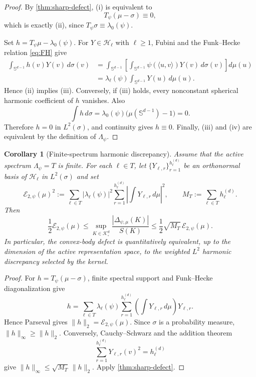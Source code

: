 \documentclass[12pt,a4paper]{article}
\newcommand{\Sph}{\mathbb S}
\newcommand{\K}{\mathcal K}
\newcommand{\Harm}{\mathcal H}
\theoremstyle{plain}
\newtheorem{corollary}[theorem]{Corollary}
\theoremstyle{definition}
\begin{document}
\begin{proof}
By \cref{thm:sharp-defect}, (i) is equivalent to
\[
 T_\psi(\mu-\sigma)\equiv0,
\]
which is exactly (ii), since $T_\psi\sigma\equiv\lambda_0(\psi)$.

Set $h=T_\psi\mu-\lambda_0(\psi)$. For $Y\in\Harm_\ell$ with $\ell\ge1$, Fubini and the Funk--Hecke relation \eqref{eq:FH} give
\[
 \begin{aligned}
 \int_{\Sph^{d-1}}h(v)Y(v)\,d\sigma(v)
 &=\int_{\Sph^{d-1}}
 \left[\int_{\Sph^{d-1}}\psi(\langle u,v\rangle)Y(v)\,d\sigma(v)\right]d\mu(u)\\
 &=\lambda_\ell(\psi)\int_{\Sph^{d-1}}Y(u)\,d\mu(u).
 \end{aligned}
\]
Hence (ii) implies (iii).  Conversely, if (iii) holds, every nonconstant spherical harmonic coefficient of $h$ vanishes.  Also
\[
 \int h\,d\sigma
 =\lambda_0(\psi)\bigl(\mu(\Sph^{d-1})-1\bigr)=0.
\]
Therefore $h=0$ in $L^2(\sigma)$, and continuity gives $h\equiv0$.  Finally, (iii) and (iv) are equivalent by the definition of $\Lambda_\psi$.
\end{proof}

\begin{corollary}[Finite-spectrum harmonic discrepancy]\label{cor:l2-discrepancy}
Assume that the active spectrum $\Lambda_\psi=T$ is finite. For each $\ell\in T$, let $\{Y_{\ell,r}\}_{r=1}^{h_\ell^{(d)}}$ be an orthonormal basis of $\Harm_\ell$ in $L^2(\sigma)$ and set
\[
 \mathcal E_{2,\psi}(\mu)^2
 :=\sum_{\ell\in T}|\lambda_\ell(\psi)|^2
 \sum_{r=1}^{h_\ell^{(d)}}\left|\int Y_{\ell,r}\,d\mu\right|^2,
 \qquad
 M_T:=\sum_{\ell\in T}h_\ell^{(d)}.
\]
Then
\begin{equation}\label{eq:l2-linf-defect}
 \frac12\mathcal E_{2,\psi}(\mu)
 \le
 \sup_{K\in\K^d_\circ}\frac{|\Delta_{\psi,\mu}(K)|}{S(K)}
 \le
 \frac12\sqrt{M_T}\,\mathcal E_{2,\psi}(\mu).
\end{equation}
In particular, the convex-body defect is quantitatively equivalent, up to the dimension of the active representation space, to the weighted $L^2$ harmonic discrepancy selected by the kernel.
\end{corollary}

\begin{proof}
For $h=T_\psi(\mu-\sigma)$, finite spectral support and Funk--Hecke diagonalization give
\[
 h=\sum_{\ell\in T}\lambda_\ell(\psi)
 \sum_{r=1}^{h_\ell^{(d)}}\left(\int Y_{\ell,r}\,d\mu\right)Y_{\ell,r}.
\]
Hence Parseval gives $\|h\|_2=\mathcal E_{2,\psi}(\mu)$. Since $\sigma$ is a probability measure, $\|h\|_\infty\ge\|h\|_2$. Conversely, Cauchy--Schwarz and the addition theorem
\[
 \sum_{r=1}^{h_\ell^{(d)}}Y_{\ell,r}(v)^2=h_\ell^{(d)}
\]
give $\|h\|_\infty\le\sqrt{M_T}\,\|h\|_2$. Apply \cref{thm:sharp-defect}.
\end{proof}
\end{document}
